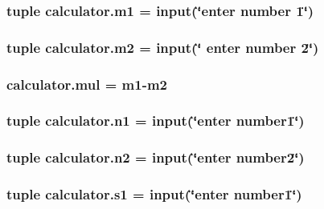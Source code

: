 \hypertarget{namespacecalculator_afa90d2ad046281727b8c96a591b420c7}{
\subsubsection[{m1}]{\setlength{\rightskip}{0pt plus 5cm}tuple calculator.\-m1 = input(\char`\"{}enter number 1\char`\"{})}}\label{namespacecalculator_afa90d2ad046281727b8c96a591b420c7}
\hypertarget{namespacecalculator_a8a81433b505a2cdf3a8a2a24f8e1e902}{
\subsubsection[{m2}]{\setlength{\rightskip}{0pt plus 5cm}tuple calculator.\-m2 = input(\char`\"{} enter number 2\char`\"{})}}\label{namespacecalculator_a8a81433b505a2cdf3a8a2a24f8e1e902}
\hypertarget{namespacecalculator_abebdec4b455059b8c28e6416ca8dc209}{
\subsubsection[{mul}]{\setlength{\rightskip}{0pt plus 5cm}calculator.\-mul = {\bf m1}-\/{\bf m2}}}\label{namespacecalculator_abebdec4b455059b8c28e6416ca8dc209}
\hypertarget{namespacecalculator_a36bd09ad7af2b355294cd40e66a73e32}{
\subsubsection[{n1}]{\setlength{\rightskip}{0pt plus 5cm}tuple calculator.\-n1 = input(\char`\"{}enter number1\char`\"{})}}\label{namespacecalculator_a36bd09ad7af2b355294cd40e66a73e32}
\hypertarget{namespacecalculator_a8ad5b68d17411aef3f785e25d608acb3}{
\subsubsection[{n2}]{\setlength{\rightskip}{0pt plus 5cm}tuple calculator.\-n2 = input(\char`\"{}enter number2\char`\"{})}}\label{namespacecalculator_a8ad5b68d17411aef3f785e25d608acb3}
\hypertarget{namespacecalculator_ad76d6157aba342d9fa3a217405d770d7}{
\subsubsection[{s1}]{\setlength{\rightskip}{0pt plus 5cm}tuple calculator.\-s1 = input(\char`\"{}enter number1\char`\"{})}}\label{namespacecalculator_ad76d6157aba342d9fa3a217405d770d7}
